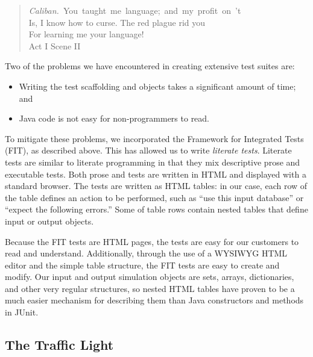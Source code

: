 \documentclass[times, 10pt,twocolumn]{article}
\newcommand{\tight}{\itemsep 0pt}
\begin{document}
\begin{quote}
\mbox{\emph{Caliban.} You taught me language; and my profit on 't} \\
Is, I know how to curse. The red plague rid you \\
For learning me your language! \\
\hspace*{1cm} Act I Scene II
\end{quote}

Two of the problems we have encountered in creating extensive test suites are:
\begin{itemize}
\tight
\item Writing the test scaffolding and objects takes a significant amount
  of time; and 
\item Java code is not easy for non-programmers to read.
\end{itemize}

To mitigate these problems, we incorporated the Framework for Integrated
Tests (FIT), as described above.  This has allowed us to write
\emph{literate tests}.  Literate tests are similar to literate programming
in that they mix descriptive prose and executable tests.  Both prose and
tests are written in HTML and displayed with a standard browser.  The tests
are written as HTML tables: in our case, each row of the table defines an
action to be performed, such as ``use this input database'' or ``expect the
following errors.''  Some of table rows contain nested tables that define
input or output objects.

Because the FIT tests are HTML pages, the tests are easy for our customers
to read and understand.  Additionally, through the use of a WYSIWYG HTML
editor and the simple table structure, the FIT tests are easy to create and
modify.  Our input and output simulation objects are sets, arrays,
dictionaries, and other very regular structures, so nested HTML tables have
proven to be a much easier mechanism for describing them than Java
constructors and methods in JUnit.

\subsection{The Traffic Light}
\end{document}
